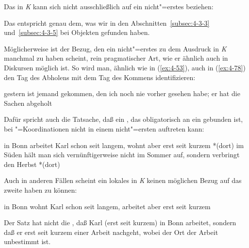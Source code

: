 \documentclass[output=paper]{langsci/langscibook}
\begin{document}
Das  in \textit{K} kann sich nicht ausschließlich auf ein nicht"=erstes  beziehen:

\begin{exe}
\ex
\label{ex:4-77}
\begin{xlist}


\end{xlist}
\end{exe}
Das entspricht genau dem, was wir in den Abschnitten~\ref{subsec:4-3-3} und~\ref{subsec:4-3-5} bei Objekten gefunden haben.

Möglicherweise ist der Bezug, den ein nicht"=erstes  zu dem Ausdruck in \textit{K} manchmal zu haben scheint, rein pragmatischer Art, wie er ähnlich auch in Diskursen möglich ist. So wird man, ähnlich wie in (\ref{ex:4-53}), auch in (\ref{ex:4-78}) den Tag des Abholens mit dem Tag des Kommens identifizieren:

\begin{exe}
\ex%
\label{ex:4-78}
gestern ist jemand gekommen, den ich noch nie vorher gesehen habe; er hat die Sachen abgeholt
\end{exe}
Dafür spricht auch die Tatsache, daß ein , das obligatorisch an ein  gebunden ist, bei "=Koordinationen nicht in einem nicht"=ersten  auftreten kann:
\begin{exe}
\ex
\label{ex:4-79}
\begin{xlist}
\ex%
\label{ex:4-79a}
in Bonn arbeitet Karl schon seit langem, wohnt aber erst seit kurzem *(dort)
\ex%
\label{ex:4-79b}
im Süden hält man sich vernünftigerweise nicht im Sommer auf, sondern verbringt den Herbst *(dort)
\end{xlist}
\end{exe}
Auch in anderen Fällen scheint ein lokales  in \textit{K} keinen möglichen Bezug auf das zweite  haben zu können:
\begin{exe}
\ex%
\label{ex:4-80}
in Bonn wohnt Karl schon seit langem, arbeitet aber erst seit kurzem
\end{exe}
Der Satz hat nicht die , daß Karl (erst seit kurzem) in Bonn arbeitet, sondern daß er erst seit kurzem einer Arbeit nachgeht, wobei der Ort der Arbeit unbestimmt ist.
\end{document}
